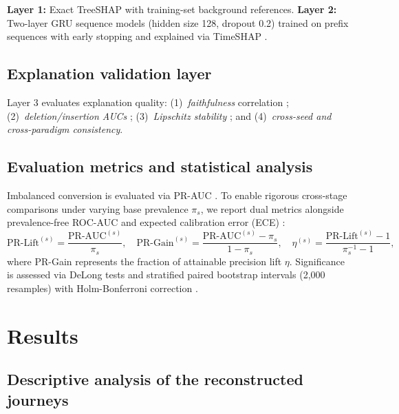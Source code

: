 \documentclass[a4paper]{article}
\begin{document}
\textbf{Layer 1:} Exact TreeSHAP \citep{lundberg2020local} with training-set
background references.
\textbf{Layer 2:} Two-layer GRU sequence models (hidden size 128, dropout 0.2)
trained on prefix sequences with early stopping and explained via TimeSHAP
\citep{bento2021timeshap}.

\subsection{Explanation validation layer}
\label{sec:methods-validation}

Layer 3 evaluates explanation quality: (1)~\emph{faithfulness} correlation
\citep{bhatt2020evaluating}; (2)~\emph{deletion/insertion AUCs}
\citep{petsiuk2018rise}; (3)~\emph{Lipschitz stability}
\citep{alvarezmelis2018robustness}; and (4)~\emph{cross-seed and cross-paradigm
consistency}.

\subsection{Evaluation metrics and statistical analysis}
\label{sec:methods-stats}

Imbalanced conversion is evaluated via PR-AUC \citep{davis2006relationship,
saito2015precision}. To enable rigorous cross-stage comparisons under varying
base prevalence $\pi_s$, we report dual metrics alongside prevalence-free ROC-AUC
and expected calibration error (ECE) \citep{guo2017calibration}:
\begin{equation}
\text{PR-Lift}^{(s)} = \frac{\text{PR-AUC}^{(s)}}{\pi_s}, \quad 
\text{PR-Gain}^{(s)} = \frac{\text{PR-AUC}^{(s)} - \pi_s}{1 - \pi_s}, \quad 
\eta^{(s)} = \frac{\text{PR-Lift}^{(s)} - 1}{\pi_s^{-1} - 1},
\label{eq:pr-metrics}
\end{equation}
where PR-Gain represents the fraction of attainable precision lift $\eta$.
Significance is assessed via DeLong tests \citep{delong1988comparing, sun2014fast} and
stratified paired bootstrap intervals (2,000 resamples) with Holm-Bonferroni
correction \citep{holm1979simple, benjamini1995controlling}.

\section{Results}
\label{sec:results}

\subsection{Descriptive analysis of the reconstructed journeys}
\label{sec:results-descriptive}
\end{document}
